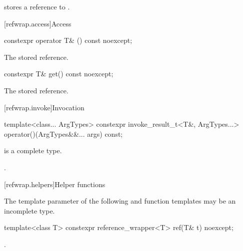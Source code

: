 \begin{itemdescr}
\pnum
\ensures
{} stores a reference to  .
\end{itemdescr}

[refwrap.access]{Access}

%
\begin{itemdecl}
constexpr operator T& () const noexcept;
\end{itemdecl}

\begin{itemdescr}
\pnum
\returns
The stored reference.
\end{itemdescr}

%
\begin{itemdecl}
constexpr T& get() const noexcept;
\end{itemdecl}

\begin{itemdescr}
\pnum
\returns
The stored reference.
\end{itemdescr}

[refwrap.invoke]{Invocation}

%
\begin{itemdecl}
template<class... ArgTypes>
  constexpr invoke_result_t<T&, ArgTypes...>
    operator()(ArgTypes&&... args) const;
\end{itemdecl}

\begin{itemdescr}
\pnum
\mandates
{} is a complete type.

\pnum
\returns
{}.
\end{itemdescr}


[refwrap.helpers]{Helper functions}

\pnum
The template parameter  of
the following  and  function templates
may be an incomplete type.

%
\begin{itemdecl}
template<class T> constexpr reference_wrapper<T> ref(T& t) noexcept;
\end{itemdecl}

\begin{itemdescr}
\pnum
\returns
{}.
\end{itemdescr}

